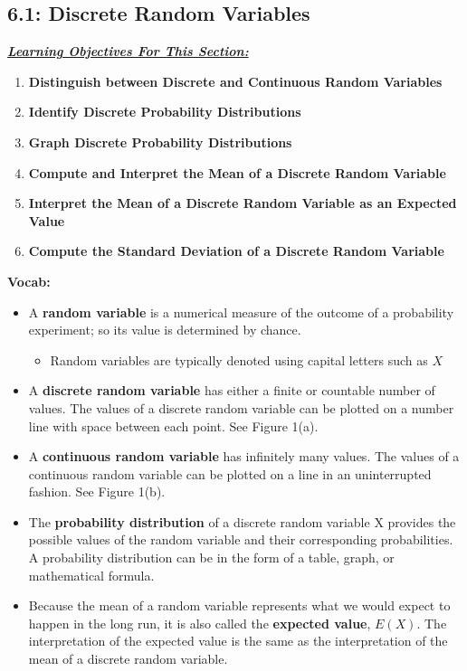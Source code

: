 \documentclass{report}
\begin{document}
    \subsection*{6.1: Discrete Random Variables}
    \bigbreak \noindent 
    \textbf{\textit{\underline{Learning Objectives For This Section:}}}
    \begin{enumerate}
        \item \textbf{Distinguish between Discrete and Continuous Random Variables}
        \item \textbf{Identify Discrete Probability Distributions}
        \item \textbf{Graph Discrete Probability Distributions}
        \item \textbf{Compute and Interpret the Mean of a Discrete Random Variable}
        \item \textbf{Interpret the Mean of a Discrete Random Variable as an Expected Value}
        \item \textbf{Compute the Standard Deviation of a Discrete Random Variable}
    \end{enumerate}
    \bigbreak \noindent 
    \textbf{Vocab:}
    \begin{itemize}
        \item A \textbf{random variable} is a numerical measure of the outcome of a probability experiment; so its value is determined by chance.
        \begin{itemize}
            \item Random variables are typically denoted using capital letters such as $X$ 
        \end{itemize}
        \item A \textbf{discrete random variable} has either a finite or countable number of values. The values of a discrete random variable can be plotted on a number line with space between each point. See Figure 1(a).
        \item A \textbf{continuous random variable} has infinitely many values. The values of a continuous random variable can be plotted on a line in an uninterrupted fashion. See Figure 1(b).
        \item The \textbf{probability distribution} of a discrete random variable X provides the possible values of the random variable and their corresponding probabilities. A probability distribution can be in the form of a table, graph, or mathematical formula.
        \item Because the mean of a random variable represents what we would expect to happen in the long run, it is also called the \textbf{expected value}, $E(X)$. The interpretation of the expected value is the same as the interpretation of the mean of a discrete random variable.
    \end{itemize}
\end{document}
